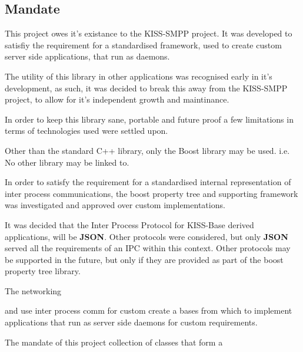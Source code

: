 \subsection*{Mandate}

This project owes it's existance to the K\-I\-S\-S-\/\-S\-M\-P\-P project. It was developed to satisfiy the requirement for a standardised framework, used to create custom server side applications, that run as daemons.

The utility of this library in other applications was recognised early in it's development, as such, it was decided to break this away from the K\-I\-S\-S-\/\-S\-M\-P\-P project, to allow for it's independent growth and maintinance.

In order to keep this library sane, portable and future proof a few limitations in terms of technologies used were settled upon.


\begin{DoxyEnumerate}
\item Other than the standard C++ library, only the Boost library may be used. i.\-e. No other library may be linked to.
\end{DoxyEnumerate}
\begin{DoxyEnumerate}
\item In order to satisfy the requirement for a standardised internal representation of inter process communications, the boost property tree and supporting framework was investigated and approved over custom implementations.
\end{DoxyEnumerate}
\begin{DoxyEnumerate}
\item It was decided that the Inter Process Protocol for K\-I\-S\-S-\/\-Base derived applications, will be {\bfseries J\-S\-O\-N}. Other protocols were considered, but only {\bfseries J\-S\-O\-N} served all the requirements of an I\-P\-C within this context. Other protocols may be supported in the future, but only if they are provided as part of the boost property tree library.
\end{DoxyEnumerate}
\begin{DoxyEnumerate}
\item The networking
\end{DoxyEnumerate}

and use inter process comm for custom create a bases from which to implement applications that run as server side daemons for custom requirements.

The mandate of this project collection of classes that form a

